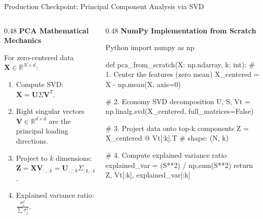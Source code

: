 \documentclass[../m00-session-02.tex]{subfiles}
\begin{document}
\begin{frame}[fragile]{Production Checkpoint: Principal Component Analysis via SVD}
  \begin{columns}[T,onlytextwidth]
    \begin{column}{0.48\textwidth}
      {\small\bfseries\color{UpGradNight}PCA Mathematical Mechanics}\par\vspace{0.08cm}
      For zero-centered data $\mathbf{X} \in \mathbb{R}^{N \times d}$:
      \begin{enumerate}\setlength{\itemsep}{0.20em}\small
        \item Compute SVD: $\mathbf{X} = \mathbf{U} \Sigma \mathbf{V}^T$.
        \item Right singular vectors $\mathbf{V} \in \mathbb{R}^{d \times d}$ are the principal loading directions.
        \item Project to $k$ dimensions: $\mathbf{Z} = \mathbf{X} \mathbf{V}_{:,:k} = \mathbf{U}_{:,:k} \Sigma_{:k,:k}$.
        \item Explained variance ratio: $\frac{\sigma_i^2}{\sum \sigma_j^2}$.
      \end{enumerate}
    \end{column}
    \hfill
    \begin{column}{0.48\textwidth}
      {\small\bfseries\color{UpGradRed}NumPy Implementation from Scratch}\par\vspace{0.06cm}
\begin{CodeBlock}{Python}
import numpy as np

def pca_from_scratch(X: np.ndarray, k: int):
    # 1. Center the features (zero mean)
    X_centered = X - np.mean(X, axis=0)
    
    # 2. Economy SVD decomposition
    U, S, Vt = np.linalg.svd(X_centered, full_matrices=False)
    
    # 3. Project data onto top-k components
    Z = X_centered @ Vt[:k].T  # shape: (N, k)
    
    # 4. Compute explained variance ratio
    explained_var = (S**2) / np.sum(S**2)
    return Z, Vt[:k], explained_var[:k]
\end{CodeBlock}
    \end{column}
  \end{columns}
\end{frame}
\end{document}
